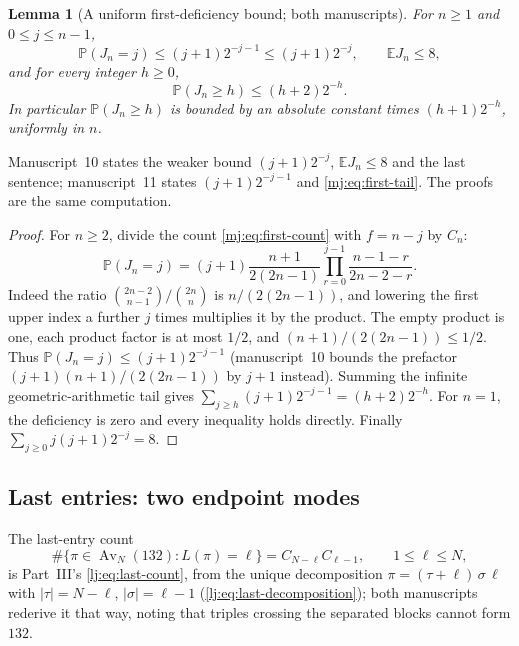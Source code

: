 \documentclass[11pt,a4paper]{article}
\newtheorem{lemma}[lemma]{Lemma}
\theoremstyle{definition}\newaliascnt{definition}{theorem}
\theoremstyle{remark}\newaliascnt{remark}{theorem}
\newcommand{\Av}{\operatorname{Av}}
\newcommand{\ljP}{\mathbb P}
\newcommand{\ljE}{\mathbb E}
\begin{document}
\begin{lemma}[A uniform first-deficiency bound; both manuscripts]
\label{mj:lem:first}
For $n\ge1$ and $0\le j\le n-1$,
\begin{equation}
 \ljP(J_n=j)\le(j+1)2^{-j-1}\le(j+1)2^{-j},
 \qquad \ljE J_n\le8,
 \label{mj:eq:first-tight}
\end{equation}
and for every integer $h\ge0$,
\begin{equation}
 \ljP(J_n\ge h)\le(h+2)2^{-h}.
 \label{mj:eq:first-tail}
\end{equation}
In particular $\ljP(J_n\ge h)$ is bounded by an absolute constant times
$(h+1)2^{-h}$, uniformly in $n$.
\end{lemma}
Manuscript~10 states the weaker bound $(j+1)2^{-j}$, $\ljE J_n\le8$ and the
last sentence; manuscript~11 states $(j+1)2^{-j-1}$ and
\eqref{mj:eq:first-tail}. The proofs are the same computation.
\begin{proof}
For $n\ge2$, divide the count \eqref{mj:eq:first-count} with $f=n-j$ by
$C_n$:
\[
 \ljP(J_n=j)=
 (j+1)\frac{n+1}{2(2n-1)}
 \prod_{r=0}^{j-1}\frac{n-1-r}{2n-2-r}.
\]
Indeed the ratio $\binom{2n-2}{n-1}/\binom{2n}{n}$ is $n/(2(2n-1))$, and
lowering the first upper index a further $j$ times multiplies it by the
product. The empty product is one, each product factor is at most $1/2$, and
$(n+1)/(2(2n-1))\le1/2$. Thus $\ljP(J_n=j)\le(j+1)2^{-j-1}$ (manuscript~10
bounds the prefactor $(j+1)(n+1)/(2(2n-1))$ by $j+1$ instead). Summing the
infinite geometric-arithmetic tail gives
$\sum_{j\ge h}(j+1)2^{-j-1}=(h+2)2^{-h}$. For $n=1$, the deficiency is zero
and every inequality holds directly. Finally $\sum_{j\ge0}j(j+1)2^{-j}=8$.
\end{proof}

\subsection{Last entries: two endpoint modes}
\label{mj:sec:last}
The last-entry count
\begin{equation}
 \#\{\pi\in\Av_N(132):L(\pi)=\ell\}=C_{N-\ell}C_{\ell-1},
 \qquad1\le\ell\le N,
 \label{mj:eq:last-count}
\end{equation}
is Part~III's \eqref{lj:eq:last-count}, from the unique decomposition
$\pi=(\tau+\ell)\,\sigma\,\ell$ with $|\tau|=N-\ell$, $|\sigma|=\ell-1$
(\eqref{lj:eq:last-decomposition}); both manuscripts rederive it that way,
noting that triples crossing the separated blocks cannot form $132$.
\end{document}
